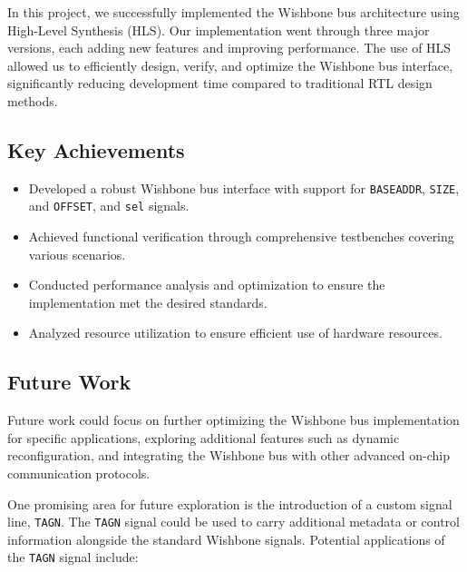 \documentclass[12pt]{report}
\begin{document}
In this project, we successfully implemented the Wishbone bus architecture using High-Level Synthesis (HLS). Our implementation went through three major versions, each adding new features and improving performance. The use of HLS allowed us to efficiently design, verify, and optimize the Wishbone bus interface, significantly reducing development time compared to traditional RTL design methods.

\subsection{Key Achievements}
\begin{itemize}
    \item Developed a robust Wishbone bus interface with support for \texttt{BASEADDR}, \texttt{SIZE}, and \texttt{OFFSET}, and \texttt{sel} signals.
    \item Achieved functional verification through comprehensive testbenches covering various scenarios.
    \item Conducted performance analysis and optimization to ensure the implementation met the desired standards.
    \item Analyzed resource utilization to ensure efficient use of hardware resources.
\end{itemize}

\subsection{Future Work}
Future work could focus on further optimizing the Wishbone bus implementation for specific applications, exploring additional features such as dynamic reconfiguration, and integrating the Wishbone bus with other advanced on-chip communication protocols.

One promising area for future exploration is the introduction of a custom signal line, \texttt{TAGN}. The \texttt{TAGN} signal could be used to carry additional metadata or control information alongside the standard Wishbone signals. Potential applications of the \texttt{TAGN} signal include:
\end{document}
